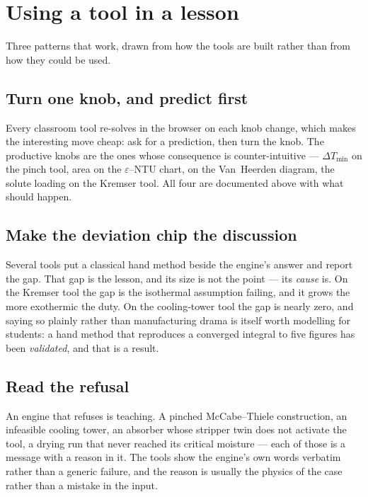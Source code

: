 \documentclass[11pt,a4paper]{article}
\begin{document}
\section{Using a tool in a lesson}\label{sec:edu-lesson}

Three patterns that work, drawn from how the tools are built rather than
from how they could be used.

\subsection*{Turn one knob, and predict first}

Every classroom tool re-solves in the browser on each knob change, which
makes the interesting move cheap: ask for a prediction, then turn the
knob.  The productive knobs are the ones whose consequence is
counter-intuitive --- $\Delta T_{\min}$ on the pinch tool, area on the
$\varepsilon$--NTU chart,  on the Van~Heerden diagram, the
solute loading on the Kremser tool.  All four are documented above with
what should happen.

\subsection*{Make the deviation chip the discussion}

Several tools put a classical hand method beside the engine's answer and
report the gap.  That gap is the lesson, and its size is not the point ---
its \emph{cause} is.  On the Kremser tool the gap is the isothermal
assumption failing, and it grows the more exothermic the duty.  On the
cooling-tower tool the gap is nearly zero, and saying so plainly rather
than manufacturing drama is itself worth modelling for students: a hand
method that reproduces a converged integral to five figures has been
\emph{validated}, and that is a result.

\subsection*{Read the refusal}

An engine that refuses is teaching.  A pinched McCabe--Thiele
construction, an infeasible cooling tower, an absorber whose stripper twin
does not activate the tool, a drying run that never reached its critical
moisture --- each of those is a message with a reason in it.  The tools
show the engine's own words verbatim rather than a generic failure, and
the reason is usually the physics of the case rather than a mistake in the
input.
\end{document}
